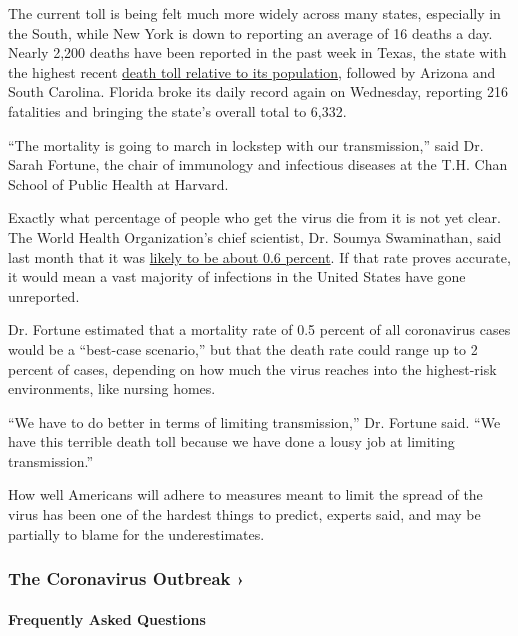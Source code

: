 The current toll is being felt much more widely across many states,
especially in the South, while New York is down to reporting an average
of 16 deaths a day. Nearly 2,200 deaths have been reported in the past
week in Texas, the state with the highest recent
\href{https://www.nytimes3xbfgragh.onion/interactive/2020/us/coronavirus-us-cases.html}{death
toll relative to its population}, followed by Arizona and South
Carolina. Florida broke its daily record again on Wednesday, reporting
216 fatalities and bringing the state's overall total to 6,332.

``The mortality is going to march in lockstep with our transmission,''
said Dr. Sarah Fortune, the chair of immunology and infectious diseases
at the T.H. Chan School of Public Health at Harvard.

Exactly what percentage of people who get the virus die from it is not
yet clear. The World Health Organization's chief scientist, Dr. Soumya
Swaminathan, said last month that it was
\href{https://www.nytimes3xbfgragh.onion/2020/07/04/health/coronavirus-death-rate.html}{likely
to be about 0.6 percent}. If that rate proves accurate, it would mean a
vast majority of infections in the United States have gone unreported.

Dr. Fortune estimated that a mortality rate of 0.5 percent of all
coronavirus cases would be a ``best-case scenario,'' but that the death
rate could range up to 2 percent of cases, depending on how much the
virus reaches into the highest-risk environments, like nursing homes.

``We have to do better in terms of limiting transmission,'' Dr. Fortune
said. ``We have this terrible death toll because we have done a lousy
job at limiting transmission.''

How well Americans will adhere to measures meant to limit the spread of
the virus has been one of the hardest things to predict, experts said,
and may be partially to blame for the underestimates.

\href{https://www.nytimes3xbfgragh.onion/news-event/coronavirus?action=click\&pgtype=Article\&state=default\&region=MAIN_CONTENT_3\&context=storylines_faq}{}

\hypertarget{the-coronavirus-outbreak-}{%
\subsubsection{The Coronavirus Outbreak
›}\label{the-coronavirus-outbreak-}}

\hypertarget{frequently-asked-questions}{%
\paragraph{Frequently Asked
Questions}\label{frequently-asked-questions}}


